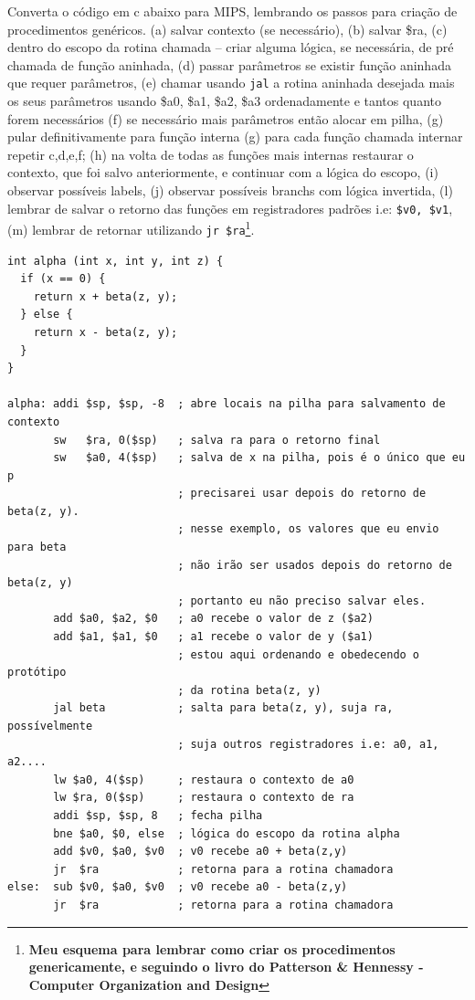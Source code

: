 \documentclass{article}
\begin{document}
Converta o código em c abaixo para MIPS, lembrando os passos para criação de 
procedimentos genéricos. (a) salvar contexto (se necessário), (b) salvar \$ra, 
(c) dentro do escopo da rotina chamada -- criar alguma lógica, se necessária, 
de pré chamada de função aninhada, (d) passar parâmetros se existir função 
aninhada que requer parâmetros, (e) chamar usando \verb|jal| a rotina aninhada 
desejada mais os seus parâmetros usando \$a0, \$a1, \$a2, \$a3 ordenadamente e 
tantos quanto forem necessários (f) se necessário mais parâmetros então alocar 
em pilha, (g) pular definitivamente para função interna (g) para cada função 
chamada internar repetir c,d,e,f; (h) na volta de todas as funções mais 
internas restaurar o contexto, que foi salvo anteriormente, e continuar com a 
lógica do escopo, (i) observar possíveis labels, (j) observar possíveis branchs 
com lógica invertida, (l) lembrar de salvar o retorno das funções em 
registradores padrões i.e: \verb|$v0, $v1|, (m) lembrar de retornar utilizando 
\verb|jr $ra|\footnote{\textbf{Meu esquema para lembrar como criar os 
procedimentos genericamente, e seguindo o livro do Patterson \& Hennessy - 
Computer Organization and Design}}.

\begin{verbatim}
int alpha (int x, int y, int z) {
  if (x == 0) {
    return x + beta(z, y);
  } else {
    return x - beta(z, y);
  }
}

alpha: addi $sp, $sp, -8  ; abre locais na pilha para salvamento de contexto
       sw   $ra, 0($sp)   ; salva ra para o retorno final
       sw   $a0, 4($sp)   ; salva de x na pilha, pois é o único que eu p
                          ; precisarei usar depois do retorno de beta(z, y).
                          ; nesse exemplo, os valores que eu envio para beta
                          ; não irão ser usados depois do retorno de beta(z, y)
                          ; portanto eu não preciso salvar eles.
       add $a0, $a2, $0   ; a0 recebe o valor de z ($a2)
       add $a1, $a1, $0   ; a1 recebe o valor de y ($a1)
                          ; estou aqui ordenando e obedecendo o protótipo
                          ; da rotina beta(z, y)
       jal beta           ; salta para beta(z, y), suja ra, possívelmente
                          ; suja outros registradores i.e: a0, a1, a2....
       lw $a0, 4($sp)     ; restaura o contexto de a0
       lw $ra, 0($sp)     ; restaura o contexto de ra
       addi $sp, $sp, 8   ; fecha pilha
       bne $a0, $0, else  ; lógica do escopo da rotina alpha
       add $v0, $a0, $v0  ; v0 recebe a0 + beta(z,y)
       jr  $ra            ; retorna para a rotina chamadora
else:  sub $v0, $a0, $v0  ; v0 recebe a0 - beta(z,y)
       jr  $ra            ; retorna para a rotina chamadora
\end{verbatim}
\end{document}
